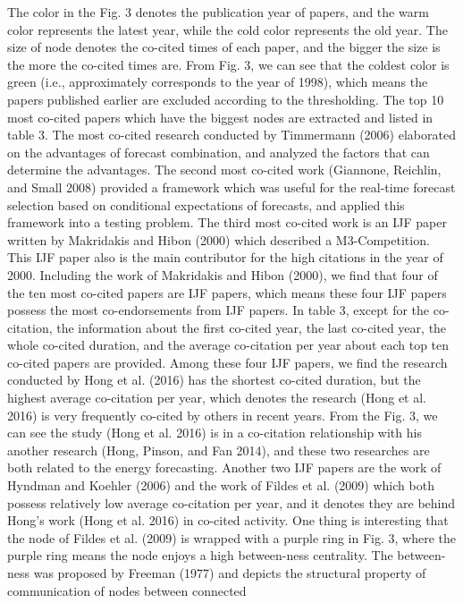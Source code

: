 \documentclass[11pt,a4paper]{elsarticle} %
\begin{document}
The color in the Fig. 3 denotes the publication year of papers, and the
warm color represents the latest year, while the cold color represents
the old year. The size of node denotes the co-cited times of each paper,
and the bigger the size is the more the co-cited times are. From Fig. 3,
we can see that the coldest color is green (i.e., approximately
corresponds to the year of 1998), which means the papers published
earlier are excluded according to the thresholding. The top 10 most
co-cited papers which have the biggest nodes are extracted and listed in
table 3. The most co-cited research conducted by Timmermann (2006)
elaborated on the advantages of forecast combination, and analyzed the
factors that can determine the advantages. The second most co-cited work
(Giannone, Reichlin, and Small 2008) provided a framework which was
useful for the real-time forecast selection based on conditional
expectations of forecasts, and applied this framework into a testing
problem. The third most co-cited work is an IJF paper written by
Makridakis and Hibon (2000) which described a M3-Competition. This IJF
paper also is the main contributor for the high citations in the year of
2000. Including the work of Makridakis and Hibon (2000), we find that
four of the ten most co-cited papers are IJF papers, which means these
four IJF papers possess the most co-endorsements from IJF papers. In
table 3, except for the co-citation, the information about the first
co-cited year, the last co-cited year, the whole co-cited duration, and
the average co-citation per year about each top ten co-cited papers are
provided. Among these four IJF papers, we find the research conducted by
Hong et al. (2016) has the shortest co-cited duration, but the highest
average co-citation per year, which denotes the research (Hong et al.
2016) is very frequently co-cited by others in recent years. From the
Fig. 3, we can see the study (Hong et al. 2016) is in a co-citation
relationship with his another research (Hong, Pinson, and Fan 2014), and
these two researches are both related to the energy forecasting. Another
two IJF papers are the work of Hyndman and Koehler (2006) and the work
of Fildes et al. (2009) which both possess relatively low average
co-citation per year, and it denotes they are behind Hong's work (Hong
et al. 2016) in co-cited activity. One thing is interesting that the
node of Fildes et al. (2009) is wrapped with a purple ring in Fig. 3,
where the purple ring means the node enjoys a high between-ness
centrality. The between-ness was proposed by Freeman (1977) and depicts
the structural property of communication of nodes between connected
\end{document}
